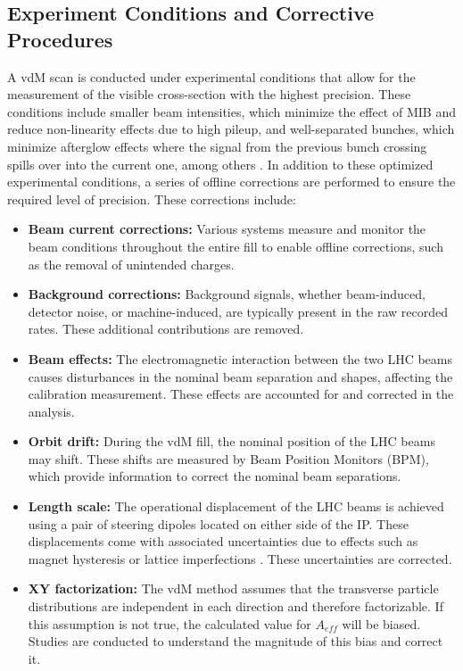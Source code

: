 
\subsection{Experiment Conditions and Corrective Procedures}

A vdM scan is conducted under experimental conditions that allow for the measurement of the visible cross-section with the highest precision. These conditions include smaller beam intensities, which minimize the effect of MIB and reduce non-linearity effects due to high pileup, and well-separated bunches, which minimize afterglow effects where the signal from the previous bunch crossing spills over into the current one, among others \cite{GRAFSTROM201597}. In addition to these optimized experimental conditions, a series of offline corrections are performed to ensure the required level of precision. These corrections include:

\begin{itemize}
    \item \textbf{Beam current corrections:} Various systems measure and monitor the beam conditions throughout the entire fill to enable offline corrections, such as the removal of unintended charges.
    \item \textbf{Background corrections:} Background signals, whether beam-induced, detector noise, or machine-induced, are typically present in the raw recorded rates. These additional contributions are removed.
    \item \textbf{Beam effects:} The electromagnetic interaction between the two LHC beams causes disturbances in the nominal beam separation and shapes, affecting the calibration measurement. These effects are accounted for and corrected in the analysis.
    \item \textbf{Orbit drift:} During the vdM fill, the nominal position of the LHC beams may shift. These shifts are measured by Beam Position Monitors (BPM), which provide information to correct the nominal beam separations.
    \item \textbf{Length scale:} The operational displacement of the LHC beams is achieved using a pair of steering dipoles located on either side of the IP. These displacements come with associated uncertainties due to effects such as magnet hysteresis or lattice imperfections \cite{Persson:2750277}. These uncertainties are corrected.
    \item \textbf{XY factorization:} The vdM method assumes that the transverse particle distributions are independent in each direction and therefore factorizable. If this assumption is not true, the calculated value for \(A_{eff}\) will be biased. Studies are conducted to understand the magnitude of this bias and correct it.
\end{itemize}

